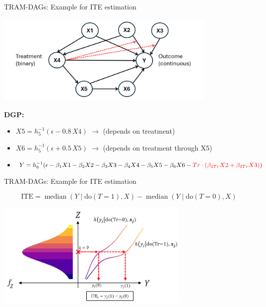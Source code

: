 \documentclass[onlytextwidth,english]{beamer}\usepackage[]{graphicx}\usepackage[]{xcolor}
\begin{document}
\begin{frame}{TRAM-DAGs: Example for ITE estimation}

\centering
\includegraphics[width=0.8\textwidth]{img/dag_ITE_observational.png}
\normalsize

\vspace{1em} %
\raggedright %

\small
\textbf{DGP:}
\begin{itemize}
    \item $X5 = h_5^{-1}(\epsilon - 0.8 \, X4 )$ \hspace{1em} $\rightarrow$ (depends on treatment)
    \item $X6 = h_5^{-1}(\epsilon + 0.5 \, X5)$ \hspace{1em} $\rightarrow$ (depends on treatment through X5)
    \item $Y = h_6^{-1}(\epsilon - \beta_1 X1 - \beta_2 X2 - \beta_3 X3 - \beta_4 X4 - \beta_5 X5 - \beta_6 X6 - \textcolor{red}{Tr \cdot (\beta_{2Tr} X2 + \beta_{3Tr} X3)})$
\end{itemize}

\end{frame}





\begin{frame}{TRAM-DAGs: Example for ITE estimation}



\[
\text{ITE} = \operatorname{median}(Y \mid \text{do}(T = 1), X) - \operatorname{median}(Y \mid \text{do}(T = 0), X)
\]

\centering

\includegraphics[width=0.7\textwidth]{img/potential_outcomes_y.png}



\end{frame}
\end{document}
